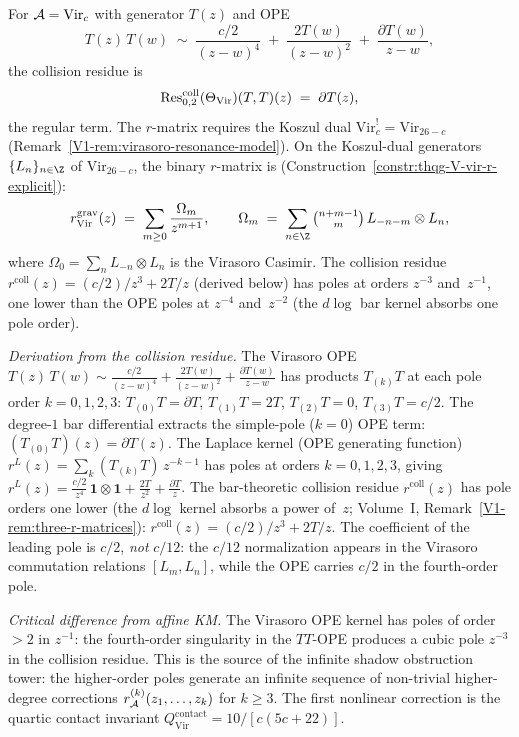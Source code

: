 \begin{computation}
For $\mathcal{A} = \mathrm{Vir}_c$ with generator $T(z)$ and OPE
\[
T(z)\,T(w)
\;\sim\;
\frac{c/2}{(z-w)^4}
\;+\;
\frac{2T(w)}{(z-w)^2}
\;+\;
\frac{\partial T(w)}{z-w},
\]
the collision residue is
\begin{equation}%
\Rescoll_{0,2}(\Theta_{\mathrm{Vir}})
 (T, T)(z)
\;=\;
\partial T(z),
\end{equation}
the regular term. The $r$-matrix requires the Koszul dual
$\mathrm{Vir}_c^! = \mathrm{Vir}_{26-c}$
(Remark~\ref{V1-rem:virasoro-resonance-model}). On the Koszul-dual
generators $\{L_n\}_{n \in \Z}$ of $\mathrm{Vir}_{26-c}$, the
binary $r$-matrix is
(Construction~\ref{constr:thqg-V-vir-r-explicit}):
\begin{equation}%
\rgrav_{\mathrm{Vir}}(z)
\;=\;
\sum_{m \geq 0}
\frac{\Omega_m}{z^{m+1}},
\qquad
\Omega_m
\;=\;
\sum_{n \in \Z}
\tbinom{n+m-1}{m}\,
L_{-n-m} \otimes L_n,
\end{equation}
where $\Omega_0 = \sum_{n} L_{-n} \otimes L_n$ is the Virasoro
Casimir. The collision residue
$r^{\mathrm{coll}}(z) = (c/2)/z^3 + 2T/z$
(derived below) has poles at orders $z^{-3}$ and~$z^{-1}$,
one lower than the OPE poles at $z^{-4}$ and~$z^{-2}$ (the $d\log$ bar kernel absorbs one pole order).

\emph{Derivation from the collision residue.}
The Virasoro OPE
$T(z)\,T(w) \sim \frac{c/2}{(z-w)^4} + \frac{2T(w)}{(z-w)^2}
+ \frac{\partial T(w)}{z-w}$
has products $T_{(k)}T$ at each pole order $k = 0,1,2,3$:
$T_{(0)}T = \partial T$,
$T_{(1)}T = 2T$,
$T_{(2)}T = 0$,
$T_{(3)}T = c/2$.
The degree-$1$ bar differential extracts the simple-pole
($k = 0$) OPE term: $(T_{(0)}T)(z) = \partial T(z)$.
The Laplace kernel (OPE generating function)
$r^L(z) = \sum_k (T_{(k)}T)\,z^{-k-1}$
has poles at orders $k = 0,1,2,3$, giving
$r^L(z) = \frac{c/2}{z^4}\,\mathbf{1} \otimes \mathbf{1}
+ \frac{2T}{z^2} + \frac{\partial T}{z}$.
The bar-theoretic collision residue $r^{\mathrm{coll}}(z)$
has pole orders one lower (the $d\log$ kernel absorbs a power
of~$z$; Volume~I, Remark~\ref{V1-rem:three-r-matrices}):
$r^{\mathrm{coll}}(z) = (c/2)/z^3 + 2T/z$.
The coefficient of the leading pole is $c/2$, \emph{not}
$c/12$: the $c/12$ normalization appears in the Virasoro
commutation relations $[L_m, L_n]$, while the OPE carries
$c/2$ in the fourth-order pole.

\emph{Critical difference from affine KM.}
The Virasoro OPE kernel has poles of order $>2$ in $z^{-1}$: the
fourth-order singularity in the $TT$-OPE produces a cubic pole
$z^{-3}$ in the collision residue. This is the source of the
infinite shadow obstruction tower: the higher-order poles generate an infinite
sequence of non-trivial higher-degree corrections
$r_{\mathcal{A}}^{(k)}(z_1,\dotsc,z_k)$ for $k \geq 3$.
The first nonlinear correction is the quartic contact invariant
$Q^{\mathrm{contact}}_{\mathrm{Vir}} = 10/[c(5c+22)]$.
\end{computation}

